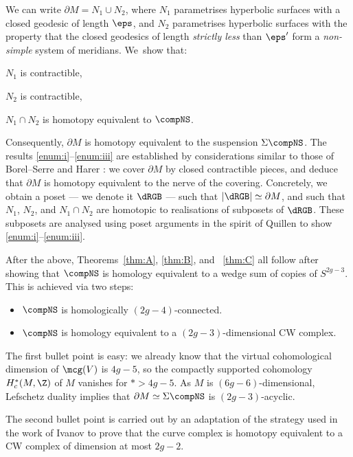 We can write $\partial M = N_1 \cup N_2$, where $N_1$ parametrises hyperbolic surfaces with a closed geodesic of length $\eps$, and $N_2$ parametrises hyperbolic surfaces with the property that the closed geodesics of length \emph{strictly less} than $\eps'$ form a \emph{non-simple} system of meridians. We~show that:
\begin{enumeratei}
\item\label{enum:i} $N_1$ is contractible,
\item\label{enum:ii} $N_2$ is contractible,
\item\label{enum:iii} $N_1 \cap N_2$ is homotopy equivalent to $\compNS$.
\end{enumeratei}
Consequently, $\partial M$ is homotopy equivalent to the suspension $\Sigma \compNS$. The results \hbox{\eqref{enum:i}--\eqref{enum:iii}} are established by considerations similar to those of Borel--Serre \cite{borelserre} and Harer \cite{harer}: we cover $\partial M$ by closed contractible pieces, and deduce that $\partial M$ is homotopy equivalent to the nerve of the covering.
Concretely, we obtain a poset --- we denote it $\dRGB$ --- such that $|\dRGB| \simeq \partial M$, and such that $N_1$, $N_2$, and $N_1 \cap N_2$ are homotopic to realisations of subposets of $\dRGB$. These subposets are analysed using poset arguments in the spirit of Quillen \cite{quillen-homotopyproperties} to show \eqref{enum:i}--\eqref{enum:iii}.

After the above, Theorems~\ref{thm:A}, \ref{thm:B}, and ~\ref{thm:C} all follow after showing that $\compNS$ is homology equivalent to a wedge sum of copies of $S^{2g-3}$. This is achieved via two steps:
\begin{itemize}
\item $\compNS$ is homologically $(2g-4)$-connected.
\item $\compNS$ is homology equivalent to a $(2g-3)$-dimensional CW complex.
\end{itemize}The first bullet point is easy: we already know that the virtual cohomological dimension of $\mcg(V)$ is $4g-5$, so the compactly supported cohomology $H^\ast_c(M,\Z)$ of $M$ vanishes for $\ast > 4g-5$. As $M$ is $(6g-6)$-dimensional, Lefschetz duality implies that $\partial M \simeq \Sigma \compNS$ is $(2g-3)$-acyclic.

The second bullet point is carried out by an adaptation of the strategy used in the work of Ivanov \cite{ivanov} to prove that the curve complex is homotopy equivalent to a CW complex of dimension at most $2g-2$.

